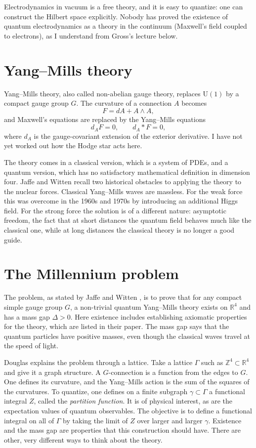 Electrodynamics in vacuum is a free theory,
and it is easy to quantize: one can construct
the Hilbert space explicitly. Nobody has
proved the existence of quantum
electrodynamics as a theory in the continuum
(Maxwell's field coupled to electrons), as I
understand from Gross's lecture below.

\section{Yang--Mills theory}

Yang--Mills theory, also called non-abelian
gauge theory, replaces $\mathrm{U}(1)$ by a
compact gauge group $G$. The curvature of a
connection $A$ becomes
$$
F=dA+A\wedge A,
$$
and Maxwell's equations are replaced by the
Yang--Mills equations
$$
d_AF=0,\qquad d_A{*}F=0,
$$
where $d_A$ is the gauge-covariant extension
of the exterior derivative. I have not yet
worked out how the Hodge star acts here.

The theory comes in a classical version,
which is a system of PDEs, and a quantum
version, which has no satisfactory
mathematical definition in dimension four.
Jaffe and Witten \cite{yangmills} recall two
historical obstacles to applying the theory
to the nuclear forces. Classical Yang--Mills
waves are massless. For the weak force this
was overcome in the 1960s and 1970s by
introducing an additional Higgs field. For
the strong force the solution is of a
different nature: asymptotic freedom, the
fact that at short distances the quantum
field behaves much like the classical one,
while at long distances the classical theory
is no longer a good guide.

\section{The Millennium problem}

The problem, as stated by Jaffe and Witten
\cite{yangmills}, is to prove that for any
compact simple gauge group $G$, a non-trivial
quantum Yang--Mills theory exists on
$\mathbb{R}^4$ and has a mass gap $\Delta>0$.
Here existence includes establishing
axiomatic properties for the theory, which
are listed in their paper. The mass gap says
that the quantum particles have positive
masses, even though the classical waves
travel at the speed of light.

Douglas \cite{reportdouglas} explains the
problem through a lattice. Take a lattice
$\Gamma$ such as $\mathbb{Z}^4\subset
\mathbb{R}^4$ and give it a graph structure.
A $G$-connection is a function from the edges
to $G$. One defines its curvature, and the
Yang--Mills action is the sum of the squares
of the curvatures. To quantize, one defines
on a finite subgraph $\gamma\subset\Gamma$ a
functional integral $Z$, called the
\emph{partition function}. It is of physical
interest, as are the expectation values of
quantum observables. The objective is to
define a functional integral on all of
$\Gamma$ by taking the limit of $Z$ over
larger and larger $\gamma$. Existence and the
mass gap are properties that this
construction should have. There are other,
very different ways to think about the
theory.

